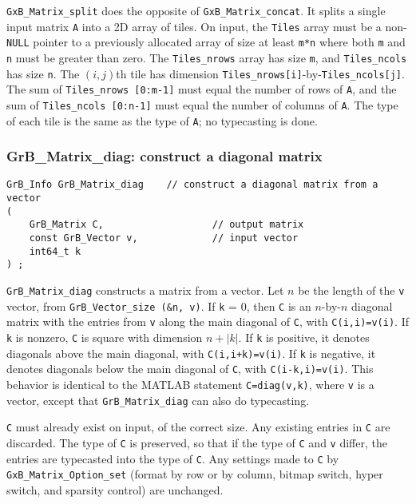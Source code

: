 \documentclass[12pt]{article}
\begin{document}
{\verb'GxB_Matrix_split' does the opposite of \verb'GxB_Matrix_concat'.  It
splits a single input matrix \verb'A' into a 2D array of tiles.  On input, the
\verb'Tiles' array must be a non-\verb'NULL' pointer to a previously allocated
array of size at least \verb'm*n' where both \verb'm' and \verb'n' must be
greater than zero.  The \verb'Tiles_nrows' array has size \verb'm', and
\verb'Tiles_ncols' has size \verb'n'.  The $(i,j)$th tile has dimension
\verb'Tiles_nrows[i]'-by-\verb'Tiles_ncols[j]'.  The sum of
\verb'Tiles_nrows [0:m-1]' must equal the number of rows of \verb'A', and the
sum of \verb'Tiles_ncols [0:n-1]' must equal the number of columns of \verb'A'.
The type of each tile is the same as the type of \verb'A'; no typecasting is
done.

\subsubsection{{\sf GrB\_Matrix\_diag:} construct a diagonal matrix}
\label{matrix_diag}

\begin{mdframed}[userdefinedwidth=6in]
{\footnotesize
\begin{verbatim}
GrB_Info GrB_Matrix_diag    // construct a diagonal matrix from a vector
(
    GrB_Matrix C,                   // output matrix
    const GrB_Vector v,             // input vector
    int64_t k
) ;
\end{verbatim} } \end{mdframed}

\verb'GrB_Matrix_diag' constructs a matrix from a vector.  Let $n$ be the
length of the \verb'v' vector, from \verb'GrB_Vector_size (&n, v)'.  If
\verb'k' = 0, then \verb'C' is an $n$-by-$n$ diagonal matrix with the entries
from \verb'v' along the main diagonal of \verb'C', with \verb'C(i,i)=v(i)'.  If
\verb'k' is nonzero, \verb'C' is square with dimension $n+|k|$.  If \verb'k' is
positive, it denotes diagonals above the main diagonal, with
\verb'C(i,i+k)=v(i)'.
If \verb'k' is negative, it denotes diagonals below the main diagonal of
\verb'C', with \verb'C(i-k,i)=v(i)'.  This behavior is identical to the MATLAB
statement \verb'C=diag(v,k)', where \verb'v' is a vector, except that
\verb'GrB_Matrix_diag' can also do typecasting.

\verb'C' must already exist on input, of the correct size.  Any existing
entries in \verb'C' are discarded.  The type of \verb'C' is preserved, so that
if the type of \verb'C' and \verb'v' differ, the entries are typecasted into
the type of \verb'C'.  Any settings made to \verb'C' by
\verb'GxB_Matrix_Option_set' (format by row or by column, bitmap switch, hyper
switch, and sparsity control) are unchanged.

}
\end{document}

